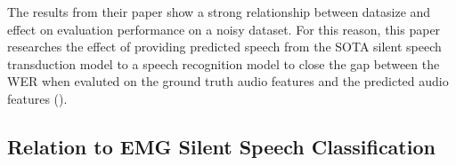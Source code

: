 The results from their paper show a strong relationship between datasize and
effect on evaluation performance on a noisy dataset. For this reason, this paper
researches the effect of providing predicted speech from the SOTA silent speech
transduction model to a speech recognition model to close the gap between
the WER when evaluted on the ground truth audio features and the predicted
audio features (\cite{DS2_original}).

\subsection{Relation to EMG Silent Speech Classification}


